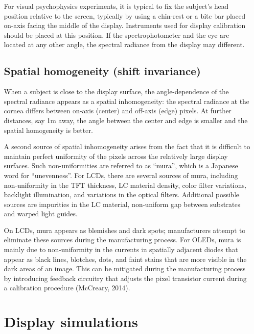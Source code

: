 \documentclass[
  letterpaper,
]{book}
\begin{document}
For visual psychophysics experiments, it is typical to fix the subject's
head position relative to the screen, typically by using a chin-rest or
a bite bar placed on-axis facing the middle of the display. Instruments
used for display calibration should be placed at this position. If the
spectrophotometer and the eye are located at any other angle, the
spectral radiance from the display may different.

\subsection{\texorpdfstring{\textbf{Spatial homogeneity (shift
invariance)}}{Spatial homogeneity (shift invariance)}}\label{spatial-homogeneity-shift-invariance}

When a subject is close to the display surface, the angle-dependence of
the spectral radiance appears as a spatial inhomogeneity: the spectral
radiance at the cornea differs between on-axis (center) and off-axis
(edge) pixels. At further distances, say 1m away, the angle between the
center and edge is smaller and the spatial homogeneity is better.

A second source of spatial inhomogeneity arises from the fact that it is
difficult to maintain perfect uniformity of the pixels across the
relatively large display surfaces. Such non-uniformities are referred to
as ``mura'', which is a Japanese word for ``unevenness''. For LCDs,
there are several sources of mura, including non-uniformity in the TFT
thickness, LC material density, color filter variations, backlight
illumination, and variations in the optical filters. Additional possible
sources are impurities in the LC material, non-uniform gap between
substrates and warped light guides.

On LCDs, mura appears as blemishes and dark spots; manufacturers attempt
to eliminate these sources during the manufacturing process. For OLEDs,
mura is mainly due to non-uniformity in the currents in spatially
adjacent diodes that appear as black lines, blotches, dots, and faint
stains that are more visible in the dark areas of an image. This can be
mitigated during the manufacturing process by introducing feedback
circuitry that adjusts the pixel transistor current during a calibration
procedure (McCreary, 2014).

\section{Display simulations}\label{display-simulations}
\end{document}

